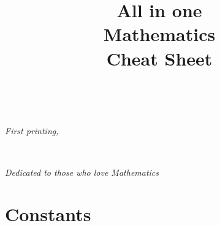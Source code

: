\documentclass{tufte-book}
\title{All in one\\ Mathematics\\\quad Cheat Sheet}
\begin{document}
\frontmatter

\maketitle

\newpage

\begin{fullwidth}
~\vfill
\thispagestyle{empty}
\setlength{\parindent}{0pt}
\setlength{\parskip}{\baselineskip}


\par{}

\par\textit{First printing, \monthyear}
\end{fullwidth}

\tableofcontents

\listoffigures
\listoftables


\cleardoublepage
\cleardoublepage
~\vfill
\begin{doublespace}
\noindent\fontsize{18}{22}\selectfont\itshape
\nohyphenation
Dedicated to those who love Mathematics
\end{doublespace}
\vfill
\vfill

\cleardoublepage

\chapter{Constants}
\end{document}
